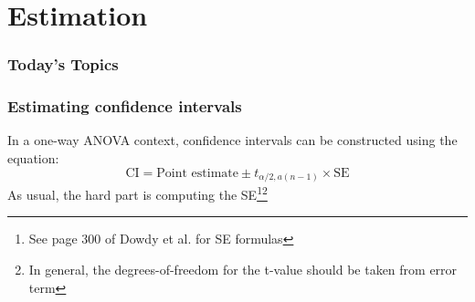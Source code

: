 \documentclass[color=usenames,dvipsnames]{beamer}\usepackage[]{graphicx}\usepackage[]{color}
\begin{document}






\section{Estimation}



\begin{frame}[plain]
  \frametitle{Today's Topics}
  \Large
  \tableofcontents[currentsection]
\end{frame}






\begin{frame}[fragile]
  \frametitle{Estimating confidence intervals}
  In a one-way ANOVA context, confidence intervals can be
  constructed using the equation:
  \[
    \text{CI} = \text{Point estimate} \pm t_{\alpha/2,a(n-1)} \times \text{SE}
  \]
  As usual, the hard part is computing the SE\footnote{See page 300 of
    Dowdy et al. for SE formulas}\footnote{In general, the
    degrees-of-freedom for the t-value should be taken from error term}  
\end{frame}





\end{document}
